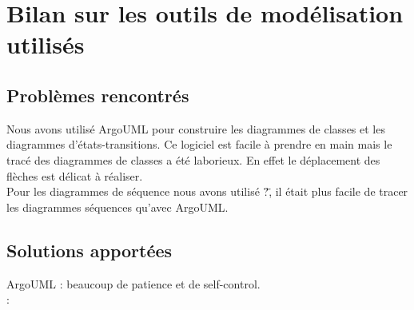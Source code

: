 \documentclass[11pt,a4paper]{report}
\begin{document}
\maketitle
\chapter*{Bilan sur les outils de modélisation utilisés}

\section*{Problèmes rencontrés}
Nous avons utilisé ArgoUML pour construire les diagrammes de classes et les diagrammes d'états-transitions. Ce logiciel est facile à prendre en main mais le tracé des diagrammes de classes a été laborieux. En effet le déplacement des flèches est délicat à réaliser.
\\Pour les diagrammes de séquence nous avons utilisé \"?\", il était plus facile de tracer les diagrammes séquences qu'avec ArgoUML.


\section*{Solutions apportées}
ArgoUML : beaucoup de patience et de self-control.
\\:
\end{document}
